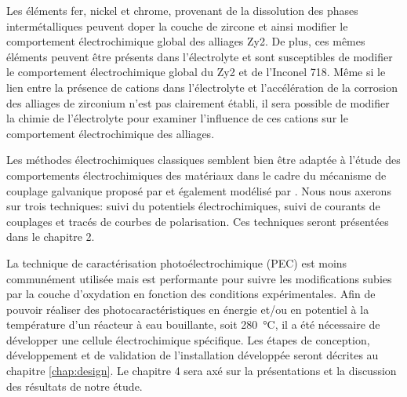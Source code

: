 \begin{refsection}
    Les éléments fer, nickel et chrome, provenant de la dissolution des phases intermétalliques 
    peuvent doper la couche de zircone et ainsi modifier le comportement électrochimique global des alliages Zy2.
    De plus, ces mêmes éléments peuvent être présents dans l'électrolyte et sont susceptibles de modifier le
    comportement électrochimique global du Zy2 et de l'Inconel 718.
    Même si le lien entre la présence de cations dans
    l'électrolyte et l'accélération de la corrosion des alliages de zirconium n'est pas clairement établi, il sera
    possible de modifier la chimie de l'électrolyte pour examiner l'influence de ces cations sur le comportement
    électrochimique des alliages.
   
    Les méthodes électrochimiques classiques semblent bien être adaptée à l'étude des comportements
    électrochimiques des matériaux dans le cadre du mécanisme de couplage galvanique proposé par \citet{Lysell2004} et
    également modélisé par \citet{Buttin2011}.
    Nous nous axerons sur trois techniques: suivi du potentiels électrochimiques, suivi de courants de
    couplages et tracés de courbes de polarisation. Ces techniques seront présentées dans le
    chapitre 2.

    La technique de caractérisation photoélectrochimique (PEC) est moins communément utilisée mais est performante
    pour suivre les modifications subies par la couche d'oxydation en fonction des conditions expérimentales. 
    Afin de pouvoir réaliser des photocaractéristiques en énergie et/ou en potentiel à la température d'un réacteur à
    eau bouillante, soit
    \SI{280}{\degreeCelsius}, il a été nécessaire de développer une cellule électrochimique spécifique.
    Les étapes de conception, développement et de validation de l'installation développée seront décrites au chapitre
    \ref{chap:design}.
    Le chapitre 4 sera axé sur la présentations et la discussion des résultats de notre étude.

    \singlespacing
\printbibliography[heading=subbibintoc]
    \onehalfspacing
\end{refsection}
